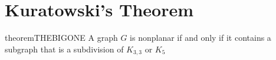 \documentclass{article}
\begin{document}
%		
%			
%
%		
%
%
%

\section{Kuratowski's Theorem}\label{TheTheorem}
\begin{restatable}[Kuratowski]{theorem}{THEBIGONE}\label{THEBIGONE}
	A graph $G$ is nonplanar if and only if it contains a subgraph that is a subdivision of $K_{3,3}$ or $K_5$
\end{restatable}
\end{document}
